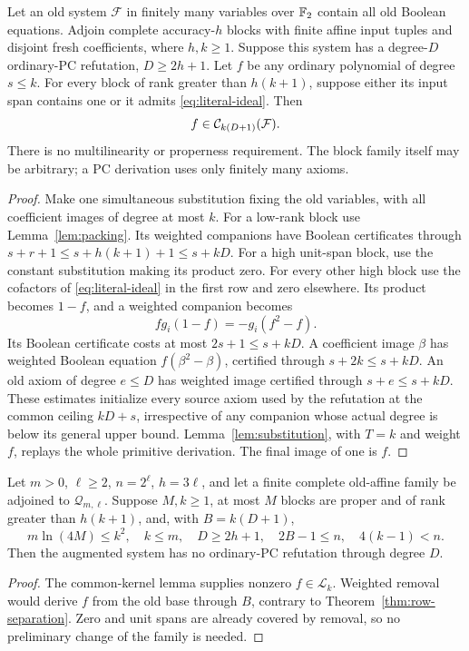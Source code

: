 \begin{lemma}\label{lem:hybrid}
Let an old system \(\mathcal F\) in finitely many variables over \(\mathbb F_2\)
contain all old Boolean equations. Adjoin complete accuracy-\(h\) blocks
with finite affine input tuples and disjoint fresh coefficients, where
\(h,k\ge1\). Suppose this system has a degree-\(D\) ordinary-PC refutation,
\(D\ge2h+1\). Let \(f\) be any ordinary polynomial of degree \(s\le k\).
For every block of rank greater than \(h(k+1)\), suppose either its input
span contains one or it admits \eqref{eq:literal-ideal}. Then
\[
 f\in\mathcal C_{k(D+1)}(\mathcal F).
\]
There is no multilinearity or properness requirement. The block family
itself may be arbitrary; a PC derivation uses only finitely many axioms.
\end{lemma}
\begin{proof}
Make one simultaneous substitution fixing the old variables, with all
coefficient images of degree at most \(k\). For a low-rank block use
Lemma~\ref{lem:packing}. Its weighted companions have Boolean certificates
through \(s+r+1\le s+h(k+1)+1\le s+kD\).
For a high unit-span block, use the constant substitution making its
product zero. For every other high block use the cofactors of
\eqref{eq:literal-ideal} in the first row and zero elsewhere. Its product
becomes \(1-f\), and a weighted companion becomes
\[
 fg_i(1-f)=-g_i(f^2-f).
\]
Its Boolean certificate costs at most \(2s+1\le s+kD\).
A coefficient image \(\beta\) has weighted Boolean equation
\(f(\beta^2-\beta)\), certified through \(s+2k\le s+kD\).
An old axiom of degree \(e\le D\) has weighted image certified through
\(s+e\le s+kD\). These estimates initialize every source axiom used
by the refutation at the common ceiling \(kD+s\), irrespective of any
companion whose actual degree is below its general upper bound.
Lemma~\ref{lem:substitution}, with \(T=k\) and weight \(f\), replays the
whole primitive derivation. The final image of one is \(f\).
\end{proof}

\begin{theorem}\label{thm:affine}
Let \(m>0\), \(\ell\ge2\), \(n=2^\ell\), \(h=3\ell\), and let a finite
complete old-affine family be adjoined to \(\mathcal Q_{m,\ell}\).
Suppose \(M,k\ge1\), at most \(M\) blocks are proper and of rank greater
than \(h(k+1)\), and, with \(B=k(D+1)\),
\begin{equation}\label{eq:affine-room}
 m\ln(4M)\le k^2,\quad k\le m,\quad D\ge2h+1,\quad
 2B-1\le n,\quad4(k-1)<n.
\end{equation}
Then the augmented system has no ordinary-PC refutation through degree \(D\).
\end{theorem}
\begin{proof}
The common-kernel lemma supplies nonzero \(f\in\mathcal L_k\).
Weighted removal would derive \(f\) from the old base through \(B\),
contrary to Theorem~\ref{thm:row-separation}. Zero and unit spans are
already covered by removal, so no preliminary change of the family is needed.
\end{proof}

